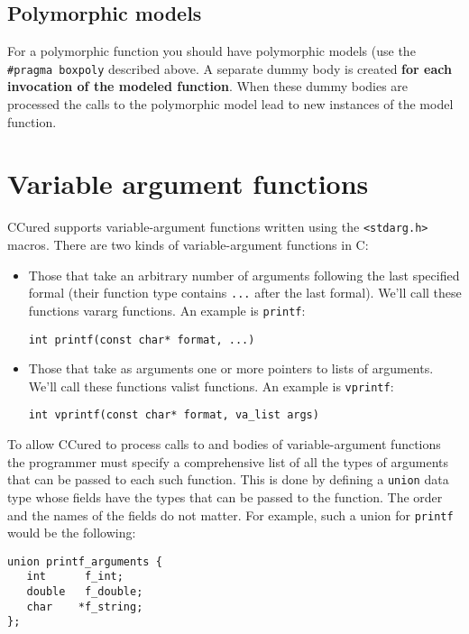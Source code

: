 \documentclass{book}
\def\t#1{{\tt #1}}
\begin{document}
     \subsection{Polymorphic models}

 For a polymorphic function you should have polymorphic models (use the
\t{\#pragma boxpoly} described above. A separate dummy body is created {\bf for
each invocation of the modeled function}. When these dummy bodies are
processed the calls to the polymorphic model lead to new instances of the
model function. 
 

       \section{Variable argument functions}

 CCured supports variable-argument functions written using the \t{<stdarg.h>}
macros. There are two kinds of variable-argument functions in C: 
\begin{itemize}
\item Those that take an arbitrary number of arguments following the last
specified formal (their function type contains \t{...} after the last formal).
We'll call these functions vararg functions. An example is \t{printf}:
\begin{verbatim}
int printf(const char* format, ...)
\end{verbatim}

\item Those that take as arguments one or more pointers to lists of
arguments. We'll call these functions valist functions. An example is
\t{vprintf}:
\begin{verbatim}
int vprintf(const char* format, va_list args)
\end{verbatim}
\end{itemize}

 To allow CCured to process calls to and bodies of variable-argument functions
the programmer must specify a comprehensive list of all the types of arguments
that can be passed to each such function. This is done by defining a \t{union}
data type whose fields have the types that can be passed to the function. The
order and the names of the fields do not matter. For example, such a union for
\t{printf} would be the following:
\begin{verbatim}
union printf_arguments {
   int      f_int;
   double   f_double;
   char    *f_string;
};
\end{verbatim}
\end{document}
